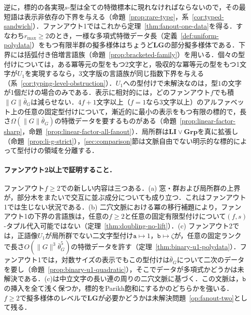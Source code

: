 \documentclass[11pt,a4paper]{ltjsarticle}
\numberwithin{equation}{section}
\theoremstyle{plain}
\theoremstyle{definition}
\theoremstyle{remark}
\begin{document}
逆に，標的の各実現$s$-型は全ての特徴標本に現れなければならないので，その最短語は表示非依存の下界を与える（命題~\ref{prop:rare-type}，系~\ref{cor:typed-sandwich}）．ファンアウト1ではこれから定理~\ref{thm:fanout-one-data}を得る．すなわち$r_{\max}\ge2$のとき，一様な多項式特徴データ長（定義~\ref{def:uniform-polydata}）をもつ有限半群の擬多様体はちょうど$\mathbf{LG}$の部分擬多様体である．下界には括弧付き倍増言語族（命題~\ref{prop:bracketed-family}）を用いる．個々の型付けについては，ある冪等元の型をもつ2文字と，吸収的な冪等元の型をもつ1文字が$U_1$を実現するなら，3文字版の言語族が同じ指数下界を与える（系~\ref{cor:typing-level-obstruction}）．$U_1$への型付けで未解決なのは，型$1$の文字が1個だけの場合のみである．表示に相対的には，どのファンアウト$f$でも積$\|G\|\bar\theta_G$は減らせない．$4f+1$文字以上（$f=1$なら$3$文字以上）のアルファベット上の任意の固定型付けについて，漸近的に最小の表示をもつ有限の標的で，長さ$\Omega(\|G\|\bar\theta_G)$の特徴データを要するものがある（命題~\ref{prop:linear-factor-sharp}，命題~\ref{prop:linear-factor-all-fanout}）．局所群は$\mathbf{LI}\vee\mathbf{Grp}$を真に拡張し（命題~\ref{prop:li-g-strict}），\ref{sec:comparison}節は文脈自由でない明示的な標的によって型付けの領域を分離する．

\paragraph{ファンアウト2以上で証明すること．}
ファンアウト$f\ge2$での新しい内容は三つある．(a) 窓・群および局所群の上界が，部分木をまたいで交互に並ぶ成分についても成り立つ．これはファンアウト1では生じない状況である．(b) 二穴文脈における冪の移行補題により，ファンアウト1の下界の言語族は，任意の$f\ge2$と任意の固定有限型付けについて$(f,s)$-タプル代入可能ではない（定理~\ref{thm:doubling-no-lift}）．(c) ファンアウト2では，正語像$U_1$が局所群でない二文字型付け$\mathtt a\mapsto1$，$\mathtt b\mapsto\zeta$が，任意の固定ランクで長さ$O(\|G\|^3\bar\theta_G^5)$の特徴データを許す（定理~\ref{thm:binary-u1-polydata}）．ファンアウト1では，対数サイズの表示でもこの型付けは$\bar\theta_G$について二次のデータを要し（命題~\ref{prop:binary-u1-quadratic}），そこでデータが多項式かどうかは未解決である．(c)は中立文字の長い連の周りの二穴文脈に基づく．この文脈は，$\mathtt b$の挿入を全て浅く保つか，標的をParikh飽和にするかのどちらかを強いる．$f\ge2$で擬多様体のレベルで$\mathbf{LG}$が必要かどうかは未解決問題~\ref{op:fanout-two}として残る．
\end{document}
